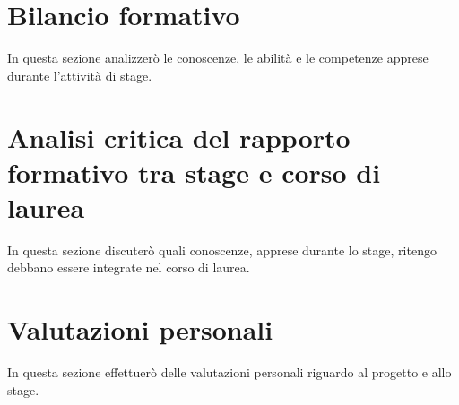 \section{Bilancio formativo}

In questa sezione analizzerò le conoscenze, le abilità e le competenze apprese durante l'attività di stage.

\section{Analisi critica del rapporto formativo tra stage e corso di laurea}

In questa sezione discuterò quali conoscenze, apprese durante lo stage, ritengo debbano essere integrate nel corso di laurea.

\section{Valutazioni personali}

In questa sezione effettuerò delle valutazioni personali riguardo al progetto e allo stage.